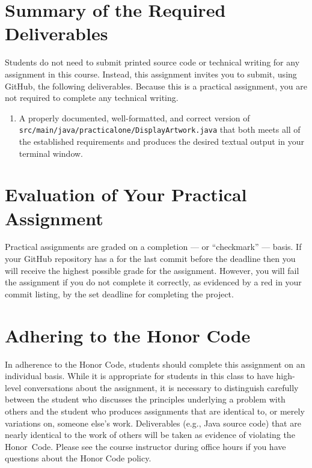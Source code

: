 \documentclass[11pt]{article}
\newcommand{\mainprogramsource}{\lstinline{src/main/java/practicalone/DisplayArtwork.java}}
\newcommand{\checkmark}{\ding{51}}
\newcommand{\naughtmark}{\ding{55}}
\begin{document}
\section*{Summary of the Required Deliverables}

\noindent Students do not need to submit printed source code or technical
writing for any assignment in this course. Instead, this assignment invites you
to submit, using GitHub, the following deliverables. Because this is a practical
assignment, you are not required to complete any technical writing.

\vspace*{-.05in}
\begin{enumerate}

\setlength{\itemsep}{0in}

\item A properly documented, well-formatted, and correct version of
  \mainprogramsource{} that both meets all of the established requirements and
  produces the desired textual output in your terminal window.

\end{enumerate}
\vspace*{-.15in}

\section*{Evaluation of Your Practical Assignment}

Practical assignments are graded on a completion --- or ``checkmark'' --- basis. If
your GitHub repository has a \checkmark{} for the last commit before the
deadline then you will receive the highest possible grade for the assignment.
However, you will fail the assignment if you do not complete it correctly, as
evidenced by a red \naughtmark{} in your commit listing, by the set deadline for
completing the project.

\section*{Adhering to the Honor Code}

In adherence to the Honor Code, students should complete this assignment on an
individual basis. While it is appropriate for students in this class to have
high-level conversations about the assignment, it is necessary to distinguish
carefully between the student who discusses the principles underlying a problem
with others and the student who produces assignments that are identical to, or
merely variations on, someone else's work. Deliverables (e.g., Java source code)
that are nearly identical to the work of others will be taken as evidence of
violating the \mbox{Honor Code}. Please see the course instructor during office
hours if you have questions about the Honor Code policy.
\end{document}
